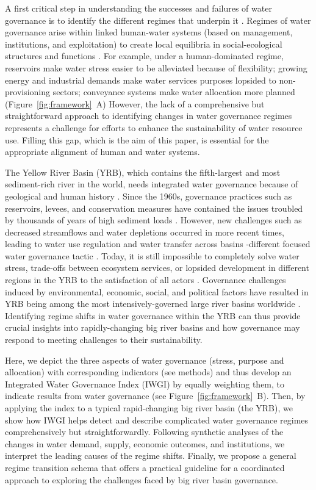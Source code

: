 A first critical step in understanding the successes and failures of water governance is to identify the different regimes that underpin it \cite{kjellen2015, grafton2013}.
Regimes of water governance arise within linked human-water systems (based on management, institutions, and exploitation) to create local equilibria in social-ecological structures and functions
\cite{falkenmark2021,bressers2013,loch2020}.
For example, under a human-dominated regime, reservoirs make water stress easier to be alleviated because of flexibility; growing energy and industrial demands make water services purposes lopsided to non-provisioning sectors; conveyance systems make water allocation more planned (Figure~\ref{fig:framework}~A)
However, the lack of a comprehensive but straightforward approach to identifying changes in water governance regimes represents a challenge for efforts to enhance the sustainability of water resource use.
Filling this gap, which is the aim of this paper, is essential for the appropriate alignment of human and water systems.

The Yellow River Basin (YRB), which contains the fifth-largest and most sediment-rich river in the world, needs integrated water governance because of geological and human history
\cite{mostern2021,best2019}.
Since the 1960s, governance practices such as reservoirs, levees, and conservation measures have contained the issues troubled by thousands of years of high sediment loads
\cite{wang2016e,song2020a}.
However, new challenges such as decreased streamflows and water depletions occurred in more recent times, leading to water use regulation and water transfer across basins -different focused water governance tactic
\cite{wang2019c}.
Today, it is still impossible to completely solve water stress, trade-offs between ecosystem services, or lopsided development in different regions in the YRB to the satisfaction of all actors
\cite{wohlfart2016a}.
Governance challenges induced by environmental, economic, social, and political factors have resulted in YRB being among the most intensively-governed large river basins worldwide \cite{nickum2021}.
Identifying regime shifts in water governance within the YRB can thus provide crucial insights into rapidly-changing big river basins and how governance may respond to meeting challenges to their sustainability.

Here, we depict the three aspects of water governance (stress, purpose and allocation) with corresponding indicators (see methods) and thus develop an Integrated Water Governance Index (IWGI) by equally weighting them, to indicate results from water governance (see Figure~\ref{fig:framework}~B).
Then, by applying the index to a typical rapid-changing big river basin (the YRB), we show how IWGI helps detect and describe complicated water governance regimes comprehensively but straightforwardly.
Following synthetic analyses of the changes in water demand, supply, economic outcomes, and institutions, we interpret the leading causes of the regime shifts.
Finally, we propose a general regime transition schema that offers a practical guideline for a coordinated approach to exploring the challenges faced by big river basin governance.


